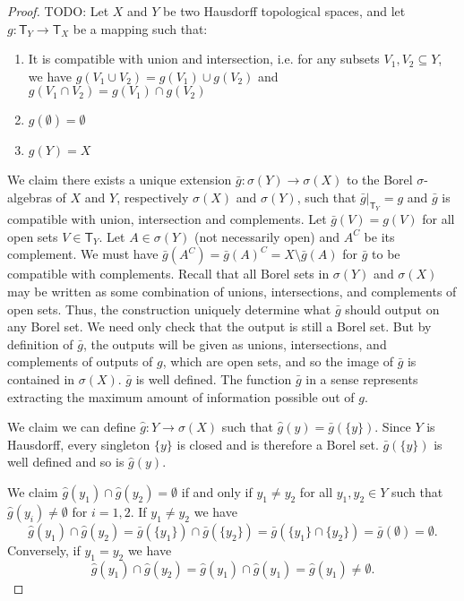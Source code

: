 \documentclass[review]{elsarticle}
\theoremstyle{plain}%
\theoremstyle{definition}
\theoremstyle{remark}
\begin{document}
\begin{proof}
TODO: 	Let $X$ and $Y$ be two Hausdorff topological spaces, and let $g: \mathsf{T}_Y \rightarrow \mathsf{T}_X$ be a mapping such that:
\begin{enumerate}
	\item It is compatible with union and intersection, i.e. for any subsets $V_1, V_2 \subseteq Y$, we have $g(V_1 \cup V_2)=g(V_1)\cup g(V_2)$ and $g(V_1 \cap V_2)=g(V_1)\cap g(V_2)$
	\item $g(\emptyset) = \emptyset$
	\item $g(Y) = X$
\end{enumerate}


	We claim there exists a unique extension $\bar{g}:\sigma(Y)\to\sigma(X)$ to the Borel $\sigma$-algebras of $X$ and $Y$, respectively $\sigma(X)$ and $\sigma(Y)$, such that $\bar{g}|_{\mathsf{T}_Y}=g$ and $\bar{g}$ is compatible with union, intersection and complements. Let $\bar{g}(V) = g(V)$ for all open sets $V \in \mathsf{T}_Y$. Let $A \in \sigma(Y)$ (not necessarily open) and $A^C$ be its complement. We must have $\bar{g}(A^C) = \bar{g}(A)^C = X\setminus \bar{g}(A)$ for $\bar{g}$ to be compatible with complements. Recall that all Borel sets in $\sigma(Y)$ and $\sigma(X)$ may be written as some combination of unions, intersections, and complements of open sets. Thus, the construction uniquely determine what $\bar{g}$ should output on any Borel set. We need only check that the output is still a Borel set. But by definition of $\bar{g}$, the outputs will be given as unions, intersections, and complements of outputs of $g$, which are open sets, and so the image of $\bar{g}$ is contained in $\sigma(X)$.  $\bar{g}$ is well defined. The function $\bar{g}$ in a sense represents extracting the maximum amount of information possible out of $g$.
	
	We claim we can define $\hat{g}:Y\to\sigma(X)$ such that $\hat{g}(y) = \bar{g}(\{y\})$. Since $Y$ is Hausdorff, every singleton $\{y\}$ is closed and is therefore a Borel set. $\bar{g}(\{y\})$ is well defined and so is $\hat{g}(y)$.
	
	We claim  $\hat{g}(y_1)\cap\hat{g}(y_2) = \emptyset$ if and only if $y_1\neq y_2$ for all $y_1,y_2\in Y$ such that $\hat{g}(y_i)\neq\emptyset$ for $i=1,2$. If $y_1\neq y_2$ we have
	$$
	\hat{g}(y_1)\cap\hat{g}(y_2) = \bar{g}(\{y_1\})\cap\bar{g}(\{y_2\}) = \bar{g}(\{y_1\}\cap\{y_2\}) = \bar{g}(\emptyset) = \emptyset.
	$$
	Conversely, if $y_1 = y_2$ we have
	$$
	\hat{g}(y_1)\cap\hat{g}(y_2) = 	\hat{g}(y_1)\cap\hat{g}(y_1) = 
	\hat{g}(y_1) \neq \emptyset.
	$$
	

\end{proof}
\end{document}
